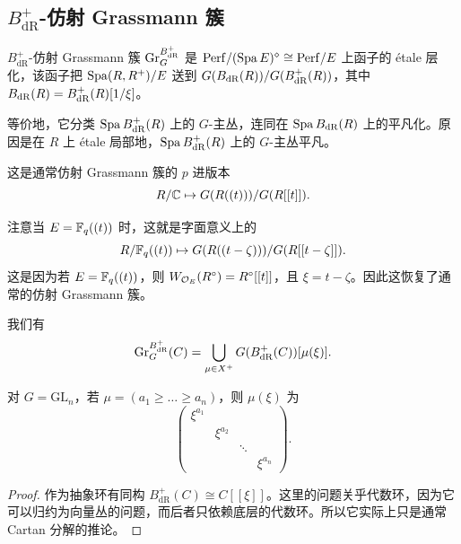 \begin{center}
\end{center}

\subsection{$B^+_{\mathrm{dR}}$-仿射 Grassmann 簇}

\begin{definition}
$B^+_{\mathrm{dR}}$-仿射 Grassmann 簇 $\mathrm{Gr}^{B^+_{\mathrm{dR}}}_G$ 是 $\mathrm{Perf}/(\operatorname{Spa} E)^{\diamond}\cong\mathrm{Perf}/E$ 上函子的 étale 层化，该函子把 $\operatorname{Spa}(R,R^+)/E$ 送到 $G(B_{\mathrm{dR}}(R))/G(B^+_{\mathrm{dR}}(R))$，其中 $B_{\mathrm{dR}}(R)=B^+_{\mathrm{dR}}(R)[1/\xi]$。
\end{definition}

等价地，它分类 $\operatorname{Spa} B^+_{\mathrm{dR}}(R)$ 上的 $G$-主丛，连同在 $\operatorname{Spa} B_{\mathrm{dR}}(R)$ 上的平凡化。原因是在 $R$ 上 étale 局部地，$\operatorname{Spa} B^+_{\mathrm{dR}}(R)$ 上的 $G$-主丛平凡。

\begin{remark}
这是通常仿射 Grassmann 簇的 $p$ 进版本
\[
R/\mathbb{C}\mapsto G(R((t)))/G(R[[t]]).
\]
\end{remark}

\begin{example}
注意当 $E=\mathbb{F}_q((t))$ 时，这就是字面意义上的
\[
R/\mathbb{F}_q((t))\mapsto G(R((t-\zeta)))/G(R[[t-\zeta]]).
\]
这是因为若 $E=\mathbb{F}_q((t))$，则 $W_{\mathcal{O}_E}(R^{\circ})=R^{\circ}[[t]]$，且 $\xi=t-\zeta$。因此这恢复了通常的仿射 Grassmann 簇。
\end{example}

\begin{proposition}[Cartan 分解]
我们有
\[
\mathrm{Gr}^{B^+_{\mathrm{dR}}}_G(C)=\bigcup_{\mu\in X^{+}}G(B^+_{\mathrm{dR}}(C))[\mu(\xi)].
\]
\end{proposition}

\begin{example}
对 $G=\mathrm{GL}_n$，若 $\mu=(a_1\ge\dots\ge a_n)$，则 $\mu(\xi)$ 为
\[
\begin{pmatrix}
\xi^{a_1} & & & \\
& \xi^{a_2} & & \\
& & \ddots & \\
& & & \xi^{a_n}
\end{pmatrix}.
\]
\end{example}

\begin{proof}
作为抽象环有同构 $B^+_{\mathrm{dR}}(C)\cong C[[\xi]]$。这里的问题关乎代数环，因为它可以归约为向量丛的问题，而后者只依赖底层的代数环。所以它实际上只是通常 Cartan 分解的推论。
\end{proof}

